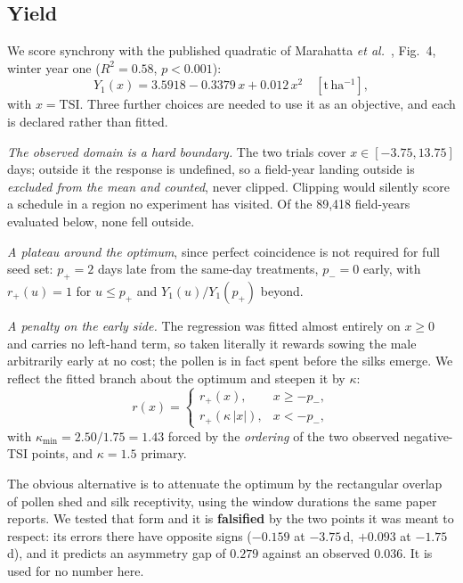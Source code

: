 \documentclass[10pt,twocolumn]{article}
\newcommand{\TSI}{\mathrm{TSI}}
\begin{document}
\subsection{Yield}

We score synchrony with the published quadratic of Marahatta \textit{et
al.}~\cite{marahatta2025}, Fig.~4, winter year one ($R^2 = 0.58$,
$p < 0.001$):
\begin{equation}
Y_1(x) = 3.5918 - 0.3379\,x + 0.012\,x^2 \quad [\mathrm{t\,ha^{-1}}],
\label{eq:yield}
\end{equation}
with $x = \TSI$. Three further choices are needed to use it as an objective,
and each is declared rather than fitted.

\emph{The observed domain is a hard boundary.} The two trials cover
$x \in [-3.75, 13.75]$ days; outside it the response is undefined, so a
field-year landing outside is \emph{excluded from the mean and counted},
never clipped. Clipping would silently score a schedule in a region no
experiment has visited. Of the 89{,}418 field-years evaluated below, none
fell outside.

\emph{A plateau around the optimum}, since perfect coincidence is not
required for full seed set: $p_+ = 2$ days late from the same-day
treatments, $p_- = 0$ early, with $r_+(u) = 1$ for $u \le p_+$ and
$Y_1(u)/Y_1(p_+)$ beyond.

\emph{A penalty on the early side.} The regression was fitted almost
entirely on $x \ge 0$ and carries no left-hand term, so taken literally it
rewards sowing the male arbitrarily early at no cost; the pollen is in fact
spent before the silks emerge. We reflect the fitted branch about the
optimum and steepen it by $\kappa$:
\begin{equation}
r(x) = \begin{cases} r_+(x), & x \ge -p_-,\\[2pt]
r_+(\kappa\,|x|), & x < -p_-, \end{cases}
\label{eq:Y}
\end{equation}
with $\kappa_{\min} = 2.50/1.75 = 1.43$ forced by the \emph{ordering} of the
two observed negative-TSI points, and $\kappa = 1.5$ primary.

The obvious alternative is to attenuate the optimum by the rectangular
overlap of pollen shed and silk receptivity, using the window durations the
same paper reports. We tested that form and it is \textbf{falsified} by the
two points it was meant to respect: its errors there have opposite signs
($-0.159$ at $-3.75$\,d, $+0.093$ at $-1.75$\,d), and it predicts an
asymmetry gap of $0.279$ against an observed $0.036$. It is used for no
number here.
\end{document}
